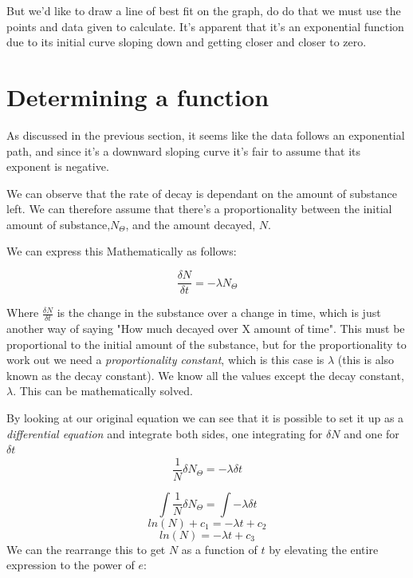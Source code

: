 \documentclass[12pt]{article}
\begin{document}
                But we'd like to draw a line of best fit on the graph, do do that we must use the points and data given to calculate. It's apparent that it's an exponential function due to its initial curve sloping down and getting closer and closer to zero. 

                \section{Determining a function}

                As discussed in the previous section, it seems like the data follows an exponential path, and since it's a downward sloping curve it's fair to assume that its exponent is negative.
                
                \noindent
                We can observe that the rate of decay is dependant on the amount of substance left. We can therefore assume that there's a proportionality between the initial amount of substance,$N_\Theta$, and the amount decayed, $N$. 

                \noindent 
                We can express this Mathematically as follows:
                
                        $$\frac{\delta N}{\delta t} = -\lambda N_\Theta $$

                Where $\frac{\delta N}{\delta t}$ is the change in the substance over a change in time, which is just another way of saying "How much decayed over X amount of time". This must be proportional to the initial amount of the substance, but for the proportionality to work out we need a \textit{proportionality constant}, which is this case is $\lambda$ (this is also known as the decay constant). 
                \noindent
                We know all the values except the decay constant, $\lambda$. This can be mathematically solved.


                \noindent
                By looking at our original equation we can see that it is possible to set it up as a \textit{differential equation} and integrate both sides, one integrating for $\delta N$ and one for $\delta t$
                        $$\frac{1}{N} \delta N_\Theta  = -\lambda \delta t$$

                        $$\int \frac{1}{N} \delta N_\Theta  = \int -\lambda \delta t$$
                        $$ ln(N) + c_1 = -\lambda t + c_2 $$
                        $$ ln(N)  = -\lambda t + c_3 $$
                \noindent
                We can the rearrange this to get $N$ as a function of $t$ by elevating the entire expression to the power of $e$:
                
\end{document}
